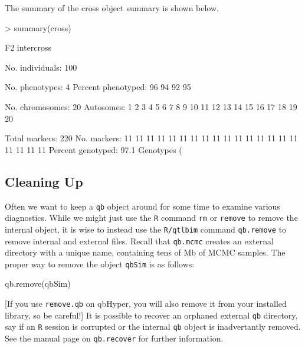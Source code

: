 \documentclass{article}
\begin{document}
The summary of the cross object summary is shown below.

\begin{Schunk}
\begin{Sinput}
> summary(cross)
\end{Sinput}
\begin{Soutput}
    F2 intercross

    No. individuals:    100 

    No. phenotypes:     4 
    Percent phenotyped: 96 94 92 95 

    No. chromosomes:    20 
        Autosomes:      1 2 3 4 5 6 7 8 9 10 11 12 13 14 15 16 17 18 19 20 

    Total markers:      220 
    No. markers:        11 11 11 11 11 11 11 11 11 11 11 11 11 11 11 11 11 11 11 11 
    Percent genotyped:  97.1 
    Genotypes (%
\end{Soutput}
\end{Schunk}

\subsection{Cleaning Up}

Often we want to keep a \texttt{qb} object around for some time to
examine various diagnostics. While we might just use the \texttt{R}
command \texttt{rm} or \texttt{remove} to remove the internal object,
it is wise to instead use the \texttt{R/qtlbim} command
\texttt{qb.remove} to remove internal and external files. Recall that
\texttt{qb.mcmc} creates an external directory with a unique name,
containing tens of Mb of MCMC samples. The proper way to remove the
object \texttt{qbSim} is as follows:

\begin{Schunk}
\begin{Sinput}
qb.remove(qbSim)
\end{Sinput}
\end{Schunk}

[If you use \texttt{remove.qb} on qbHyper, you will also remove it
from your installed library, so be careful!]
It is possible to recover an orphaned external \texttt{qb} directory,
say if an \texttt{R} session is corrupted or the internal \texttt{qb}
object is inadvertantly removed. See the manual page on
\texttt{qb.recover} for further information.
\end{document}
